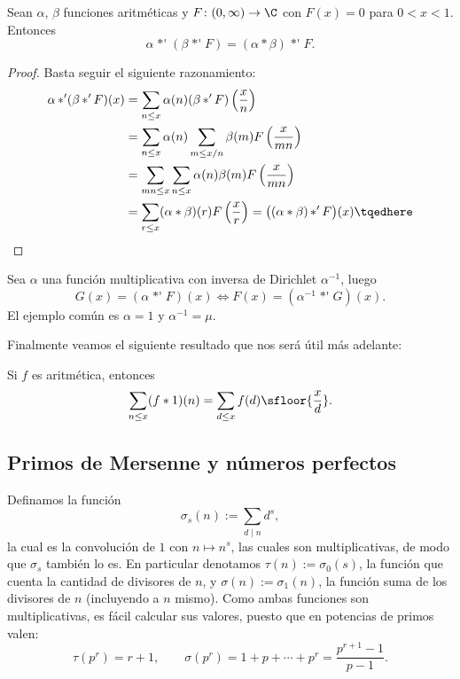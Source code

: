 \documentclass[teoria-numeros.tex]{subfiles}
\begin{document}
\begin{lem}
	Sean $\alpha$, $\beta$ funciones aritméticas y $F\colon (0, \infty) \to \C$ con $F(x) = 0$ para $0 < x < 1$.
	Entonces
	$$ \alpha \mathop{*'} (\beta \mathop{*'} F) = (\alpha * \beta) \mathop{*'} F. $$
\end{lem}
\begin{proof}
	Basta seguir el siguiente razonamiento:
	\begin{align*}
		\alpha \mathop{*'} (\beta \mathop{*'} F)(x) &= \sum_{n\le x} \alpha(n) (\beta \mathop{*'} F)\left( \frac{x}{n} \right) \\
		&= \sum_{n\le x} \alpha(n) \sum_{m \le x/n}\beta(m) F\left( \frac{x}{mn} \right) \\
		&= \sum_{mn \le x}\sum_{n\le x} \alpha(n) \beta(m) F\left( \frac{x}{mn} \right) \\
		&= \sum_{r \le x} (\alpha*\beta)(r) F\left( \frac{x}{r} \right) = \big( (\alpha * \beta) \mathop{*'} F \big)(x) \tqedhere
	\end{align*}
\end{proof}

\begin{thm}
	Sea $\alpha$ una función multiplicativa con inversa de Dirichlet $\alpha^{-1}$, luego
	$$ G(x) = (\alpha \mathop{*'} F)(x) \iff F(x) = (\alpha^{-1} \mathop{*'} G)(x). $$
	El ejemplo común es $\alpha = 1$ y $\alpha^{-1} = \mu$.
\end{thm}

Finalmente veamos el siguiente resultado que nos será útil más adelante:
\begin{thm}\label{thm:arithmetic_sum_formula}
	Si $f$ es aritmética, entonces
	$$ \sum_{n\le x} (f*1)(n) = \sum_{d\le x} f(d) \sfloor{ \frac{x}{d} }. $$
\end{thm}

\subsection{Primos de Mersenne y números perfectos}%
\label{sec:perfect_numbers}
Definamos la función
$$ \sigma_s(n) := \sum_{d \mid n} d^s, $$
la cual es la convolución de $1$ con $n \mapsto n^s$, las cuales son multiplicativas, de modo que $\sigma_s$ también lo es.
En particular denotamos $\tau(n) := \sigma_0(s)$, la función que cuenta la cantidad de divisores de $n$,
y $\sigma(n) := \sigma_1(n)$, la función suma de los divisores de $n$ (incluyendo a $n$ mismo).
Como ambas funciones son multiplicativas, es fácil calcular sus valores, puesto que en potencias de primos valen:
$$ \tau(p^r) = r + 1, \qquad \sigma(p^r) = 1 + p + \cdots + p^r = \frac{p^{r+1} - 1}{p - 1}. $$
\end{document}
